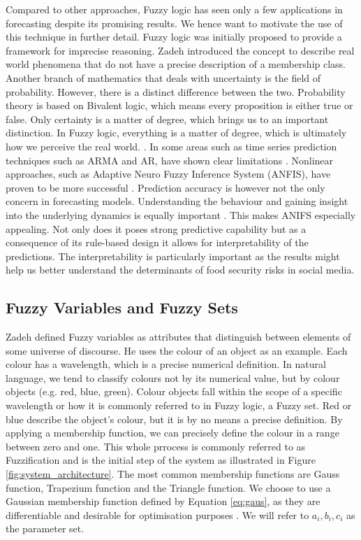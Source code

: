 Compared to other approaches, Fuzzy logic has seen only a few applications in forecasting despite its promising results. We hence want to motivate the use of this technique in further detail. Fuzzy logic was initially proposed to provide a framework for imprecise reasoning. Zadeh \cite{Zadeh65} introduced the concept to describe real world phenomena that do not have a precise description of a membership class. Another branch of mathematics that deals with uncertainty is the field of probability. However, there is a distinct difference between the two. Probability theory is based on Bivalent logic, which means every proposition is either true or false. Only certainty is a matter of degree, which brings us to an important distinction. In Fuzzy logic, everything is a matter of degree, which is ultimately how we perceive the real world.  \cite{Jang91}.  In some areas such as time series prediction techniques such as ARMA and AR, have shown clear limitations \cite{box90}. Nonlinear approaches, such as Adaptive Neuro Fuzzy Inference System (ANFIS), have proven to be more successful \cite{chap04}. Prediction accuracy is however not the only concern in forecasting models. Understanding the behaviour and gaining insight into the underlying dynamics is equally important \cite{neil93}. This makes ANIFS especially appealing. Not only does it poses strong predictive capability but as a consequence of its rule-based design it allows for interpretability of the predictions. The interpretability is particularly important as the results might help us better understand the determinants of food security risks in social media. 



\subsection {Fuzzy Variables and Fuzzy Sets }
\label{fuzzification}

Zadeh \cite{Zadeh65}  defined Fuzzy variables as attributes that distinguish between elements of some universe of discourse. He uses the colour of an object as an example. Each colour has a wavelength, which is a precise numerical definition. In natural language, we tend to classify colours not by its numerical value, but by colour objects (e.g. red, blue, green). Colour objects fall within the scope of a specific wavelength or how it is commonly referred to in Fuzzy logic,  a Fuzzy set. Red or blue describe the object's colour, but it is by no means a precise definition. By applying a membership function, we can precisely define the colour in a range between zero and one. This whole prrocess is commonly referred to as Fuzzification and is the initial step of the system as illustrated in Figure \ref{fig:system_architecture}. The most common membership functions are Gauss function, Trapezium function and the Triangle function. We choose to use a Gaussian membership function defined by Equation \ref{eq:gaus},  as they are differentiable and desirable for optimisation purposes \cite{wu12}. We will refer to $a_i, b_i, c_i$ as the parameter set.  

